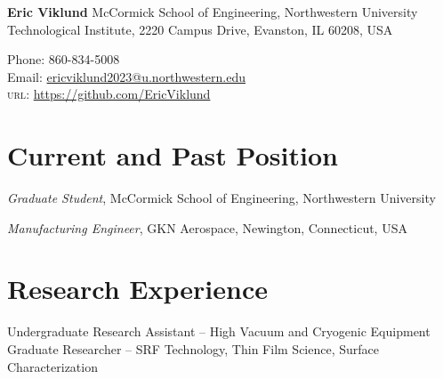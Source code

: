 \documentclass[11pt]{article} %
\begin{document}

{\LARGE\bfseries Eric Viklund} %
\bigskip\medskip %
McCormick School of Engineering,  Northwestern University\\ %
Technological Institute, 2220 Campus Drive, Evanston, IL 60208, USA
\medskip %

Phone: 860-834-5008\\ %
Email: \href{mailto:ericviklund2023@u.northwestern.edu}{ericviklund2023@u.northwestern.edu}\\ %
\textsc{url}: \href{https://github.com/EricViklund}{https://github.com/EricViklund} %

\medskip  %


\section*{Current and Past Position}

\emph{Graduate Student}, McCormick School of Engineering,  Northwestern University %


\emph{Manufacturing Engineer}, GKN Aerospace, Newington, Connecticut, USA


\section*{Research Experience}

Undergraduate Research Assistant -- High Vacuum and Cryogenic Equipment\\
Graduate Researcher -- SRF Technology, Thin Film Science, Surface Characterization 




\end{document}
